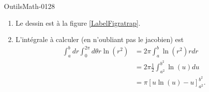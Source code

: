 \begin{corrige}{OutilsMath-0128}
\begin{enumerate}
        \item
            Le dessin est à la figure \ref{LabelFigratrap}.
            \newcommand{\CaptionFigratrap}{Le dessin de l'exerice \ref{exoOutilsMath-0128}.}
            
        \item
            L'intégrale à calculer (en n'oubliant pas le jacobien) est
            \begin{subequations}
                \begin{align}
                    \int_a^bdr\int_0^{2\pi}d\theta r\ln(r^2)&=2\pi\int_a^b\ln(r^2)rdr\\
                    &=2\pi\frac{ 1 }{2}\int_{a^2}^{b^2}\ln(u)du\\
                    &=\pi\left[ u\ln(u)-u \right]_{a^2}^{b^2}.
                \end{align}
            \end{subequations}

    \end{enumerate}

\end{corrige}
